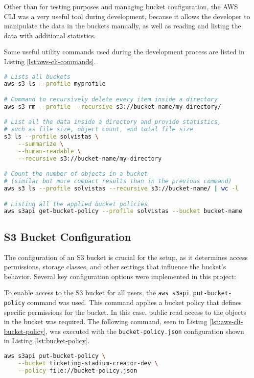 Other than for testing purposes and managing bucket configuration, the AWS CLI was a very useful tool during development, because it allows the developer to manipulate the data in the buckets manually, as well as reading and listing the data with additional statistics.

Some useful utility commands used during the development process are listed in Listing \ref{lst:aws-cli-commands}.

\begin{lstlisting}[language=bash, caption={Useful AWS CLI Commands}, label={lst:aws-cli-commands}]
# Lists all buckets
aws s3 ls --profile myprofile

# Command to recursively delete every item inside a directory
aws s3 rm --profile --recursive s3://bucket-name/my-directory/

# List all the data inside a directory and provide statistics,
# such as file size, object count, and total file size
s3 ls --profile solvistas \
    --summarize \
    --human-readable \
    --recursive s3://bucket-name/my-directory

# Count the number of objects in a bucket
# (similar but more compact results than in the previous command)
aws s3 ls --profile solvistas --recursive s3://bucket-name/ | wc -l

# Listing all the applied bucket policies
aws s3api get-bucket-policy --profile solvistas --bucket bucket-name

\end{lstlisting}

\subsection{S3 Bucket Configuration}
The configuration of an S3 bucket is crucial for the setup, as it determines access permissions, storage classes, and other settings that influence the bucket’s behavior. Several key configuration options were implemented in this project:

To enable access to the S3 bucket for all users, the \texttt{aws s3api put-bucket-policy} command was used. This command applies a bucket policy that defines specific permissions for the bucket. In this case, public read access to the objects in the bucket was required. The following command, seen in Listing \ref{lst:aws-cli-bucket-policy}, was executed with the \texttt{bucket-policy.json} configuration shown in Listing \ref{lst:bucket-policy}.

\begin{lstlisting}[language=bash, caption={AWS CLI Command to Set a Bucket Policy}, label={lst:aws-cli-bucket-policy}]
aws s3api put-bucket-policy \
    --bucket ticketing-stadium-creator-dev \
    --policy file://bucket-policy.json
\end{lstlisting}

